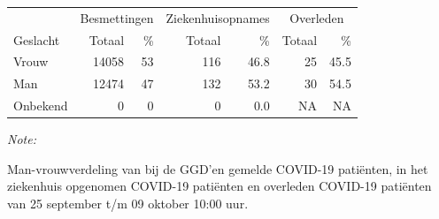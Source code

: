\documentclass[
  english,
  man,floatsintext]{apa6}
\begin{document}
\begin{table}
\centering\begingroup\fontsize{11}{13}\selectfont

\begin{threeparttable}
\begin{tabular}{lrrrrrr}
\toprule
\multicolumn{1}{c}{ } & \multicolumn{2}{c}{Besmettingen} & \multicolumn{2}{c}{Ziekenhuisopnames} & \multicolumn{2}{c}{Overleden} \\
\cmidrule(l{3pt}r{3pt}){2-3} \cmidrule(l{3pt}r{3pt}){4-5} \cmidrule(l{3pt}r{3pt}){6-7}
Geslacht & Totaal & \% & Totaal & \% & Totaal & \%\\
\midrule
Vrouw & 14058 & 53 & 116 & 46.8 & 25 & 45.5\\
Man & 12474 & 47 & 132 & 53.2 & 30 & 54.5\\
Onbekend & 0 & 0 & 0 & 0.0 & NA & NA\\
\bottomrule
\end{tabular}
\begin{tablenotes}
\item \textit{Note: } 
\item Man-vrouwverdeling van bij de GGD’en gemelde COVID-19 patiënten, in het ziekenhuis opgenomen COVID-19 patiënten en overleden COVID-19 patiënten van 25 september t/m 09 oktober 10:00 uur.
\end{tablenotes}
\end{threeparttable}
\endgroup{}
\end{table}
\newpage
\end{document}
